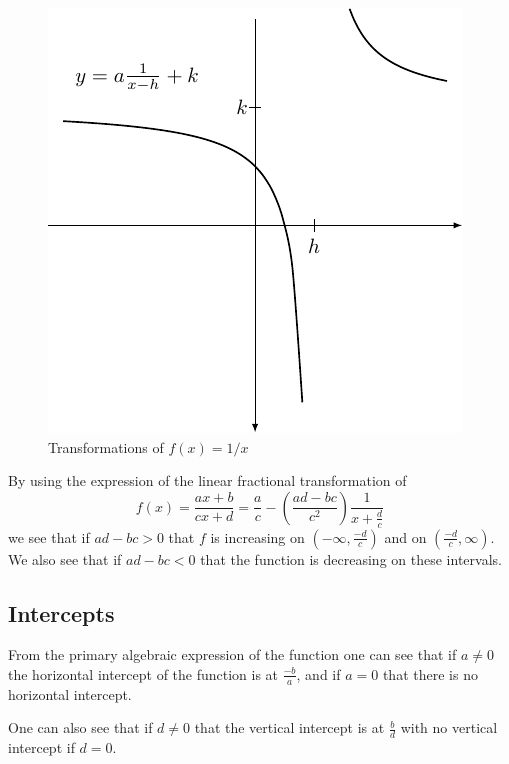 \documentclass[
]{book}
\theoremstyle{definition}
\theoremstyle{definition}
\theoremstyle{definition}
\theoremstyle{remark}
\begin{document}
\begin{figure}

{\centering \includegraphics[width=1\linewidth]{tikz/x-1transform} 

}

\caption{Transformations of $f(x)=1/x$}\label{fig:LFT-desmos}
\end{figure}

By using the expression of the linear fractional transformation of \[f(x)=\frac{ax+b}{cx+d}= \frac{a}{c} - \left(\frac{ad-bc}{c^2}\right) \frac{1}{x+\frac{d}{c}}\] we see that if
\(ad-bc>0\) that \(f\) is increasing on \((-\infty, \frac{-d}{c})\) and on \((\frac{-d}{c}, \infty)\). We also see that if \(ad-bc<0\) that the function is decreasing on these intervals.

\hypertarget{intercepts-1}{%
\subsection{Intercepts}\label{intercepts-1}}

From the primary algebraic expression of the function one can see that if \(a\neq 0\) the horizontal intercept of the function is at \(\frac{-b}{a}\), and if \(a=0\) that there is no horizontal intercept.

One can also see that if \(d \neq 0\) that the vertical intercept is at \(\frac{b}{d}\) with no vertical intercept if \(d=0\).
\end{document}
